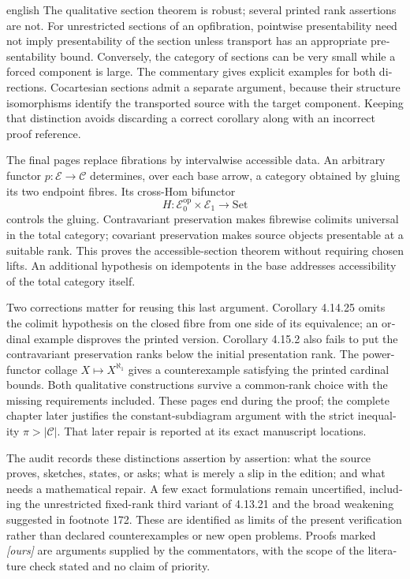 \begin{otherlanguage}{english}
\begin{otherlanguage*}{english}
The qualitative section theorem is robust; several printed rank assertions are not. For unrestricted sections of an opfibration, pointwise presentability need not imply presentability of the section unless transport has an appropriate presentability bound. Conversely, the category of sections can be very small while a forced component is large. The commentary gives explicit examples for both directions. Cocartesian sections admit a separate argument, because their structure isomorphisms identify the transported source with the target component. Keeping that distinction avoids discarding a correct corollary along with an incorrect proof reference.

The final pages replace fibrations by intervalwise accessible data. An arbitrary functor $p:\mathcal E\to\mathcal C$ determines, over each base arrow, a category obtained by gluing its two endpoint fibres. Its cross-Hom bifunctor
\[
 H:\mathcal E_0^{\mathrm{op}}\times\mathcal E_1\to\mathrm{Set}
\]
controls the gluing. Contravariant preservation makes fibrewise colimits universal in the total category; covariant preservation makes source objects presentable at a suitable rank. This proves the accessible-section theorem without requiring chosen lifts. An additional hypothesis on idempotents in the base addresses accessibility of the total category itself.

Two corrections matter for reusing this last argument. Corollary 4.14.25 omits the colimit hypothesis on the closed fibre from one side of its equivalence; an ordinal example disproves the printed version. Corollary 4.15.2 also fails to put the contravariant preservation ranks below the initial presentation rank. The power-functor collage $X\mapsto X^{\aleph_1}$ gives a counterexample satisfying the printed cardinal bounds. Both qualitative constructions survive a common-rank choice with the missing requirements included. These pages end during the proof; the complete chapter later justifies the constant-subdiagram argument with the strict inequality $\pi>|\mathcal C|$. That later repair is reported at its exact manuscript locations.

The audit records these distinctions assertion by assertion: what the source proves, sketches, states, or asks; what is merely a slip in the edition; and what needs a mathematical repair. A few exact formulations remain uncertified, including the unrestricted fixed-rank third variant of 4.13.21 and the broad weakening suggested in footnote 172. These are identified as limits of the present verification rather than declared counterexamples or new open problems. Proofs marked \emph{[ours]} are arguments supplied by the commentators, with the scope of the literature check stated and no claim of priority.

\end{otherlanguage*}
\end{otherlanguage}
\dgrchunkend
